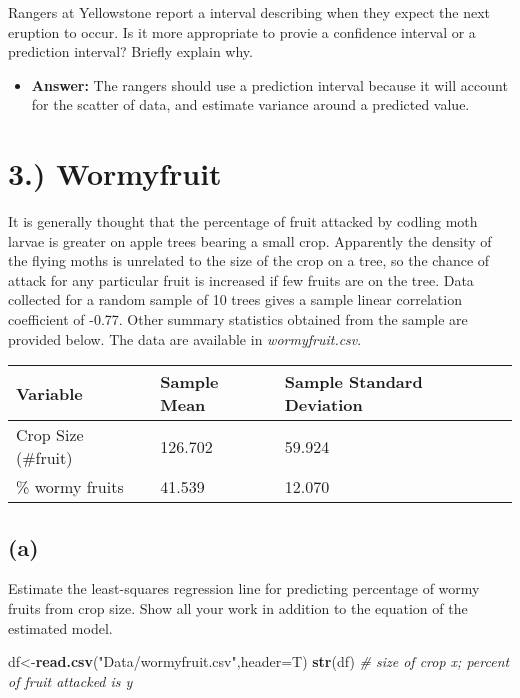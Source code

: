 \documentclass[]{article}
\newenvironment{Shaded}{\begin{snugshade}}{\end{snugshade}}
\newcommand{\KeywordTok}[1]{\textcolor[rgb]{0.13,0.29,0.53}{\textbf{#1}}}
\newcommand{\DataTypeTok}[1]{\textcolor[rgb]{0.13,0.29,0.53}{#1}}
\newcommand{\StringTok}[1]{\textcolor[rgb]{0.31,0.60,0.02}{#1}}
\newcommand{\CommentTok}[1]{\textcolor[rgb]{0.56,0.35,0.01}{\textit{#1}}}
\newcommand{\NormalTok}[1]{#1}
\providecommand{\tightlist}{%
  \setlength{\itemsep}{0pt}\setlength{\parskip}{0pt}}
\begin{document}
Rangers at Yellowstone report a interval describing when they expect the
next eruption to occur. Is it more appropriate to provie a confidence
interval or a prediction interval? Briefly explain why.

\begin{itemize}
\tightlist
\item
  \textbf{Answer:} The rangers should use a prediction interval because
  it will account for the scatter of data, and estimate variance around
  a predicted value.
\end{itemize}

\section{3.) Wormyfruit}\label{wormyfruit}

It is generally thought that the percentage of fruit attacked by codling
moth larvae is greater on apple trees bearing a small crop. Apparently
the density of the flying moths is unrelated to the size of the crop on
a tree, so the chance of attack for any particular fruit is increased if
few fruits are on the tree. Data collected for a random sample of 10
trees gives a sample linear correlation coefficient of -0.77. Other
summary statistics obtained from the sample are provided below. The data
are available in \emph{wormyfruit.csv}.

\begin{longtable}[]{@{}lll@{}}
\toprule
Variable & Sample Mean & Sample Standard Deviation\tabularnewline
\midrule
\endhead
Crop Size (\#fruit) & 126.702 & 59.924\tabularnewline
\% wormy fruits & 41.539 & 12.070\tabularnewline
\bottomrule
\end{longtable}

\subsection{(a)}\label{a-2}

Estimate the least-squares regression line for predicting percentage of
wormy fruits from crop size. Show all your work in addition to the
equation of the estimated model.

\begin{Shaded}
\begin{Highlighting}[]
\NormalTok{df<-}\KeywordTok{read.csv}\NormalTok{(}\StringTok{"Data/wormyfruit.csv"}\NormalTok{,}\DataTypeTok{header=}\NormalTok{T)}
\KeywordTok{str}\NormalTok{(df) }\CommentTok{# size of crop x; percent of fruit attacked is y}
\end{Highlighting}
\end{Shaded}
\end{document}
